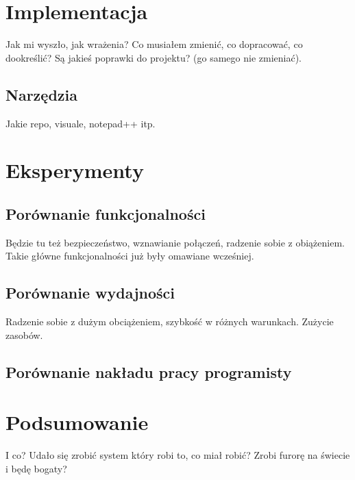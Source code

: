 \documentclass[twoside,a4paper]{book}
\begin{document}
\chapter{Implementacja}
Jak mi wyszło, jak wrażenia? Co musiałem zmienić, co dopracować, co dookreślić? Są jakieś poprawki do projektu? (go samego nie zmieniać).

\section{Narzędzia}
Jakie repo, visuale, notepad++ itp.

\chapter{Eksperymenty}

\section{Porównanie funkcjonalności}
Będzie tu też bezpieczeństwo, wznawianie połączeń, radzenie sobie z obiążeniem. Takie główne funkcjonalności już były omawiane wcześniej.

\section{Porównanie wydajności}
Radzenie sobie z dużym obciążeniem, szybkość w różnych warunkach. Zużycie zasobów.

\section{Porównanie nakładu pracy programisty}


\chapter{Podsumowanie}
I co? Udało się zrobić system który robi to, co miał robić? Zrobi furorę na świecie i będę bogaty?

\backmatter

\listoffigures
\listoftables



\end{document}
